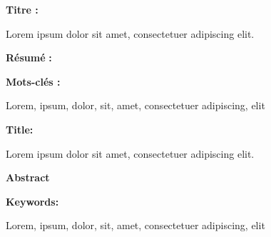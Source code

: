 \newpage
\thispagestyle{empty}
\parskip 7pt


{\bfseries Titre :}

Lorem ipsum dolor sit amet, consectetuer adipiscing elit.

{\bfseries Résumé}  {\bfseries :}

\lipsum[1-2]

{\bfseries Mots-clés :}

Lorem, ipsum, dolor, sit, amet, consectetuer adipiscing, elit

\vspace*{3mm}
\hrulefill
\vspace*{3mm}


{\bfseries Title:}

Lorem ipsum dolor sit amet, consectetuer adipiscing elit.

{\bfseries Abstract} 

\lipsum[1-2]

{\bfseries Keywords:}

Lorem, ipsum, dolor, sit, amet, consectetuer adipiscing, elit